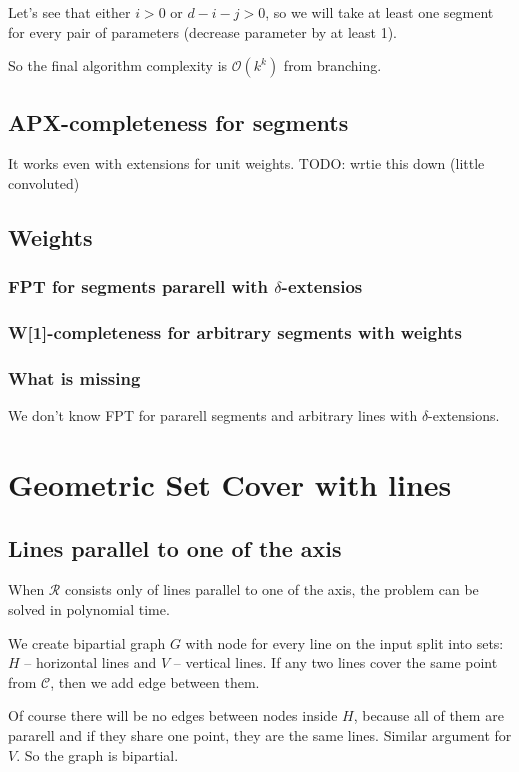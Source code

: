 \documentclass[en]{pracamgr}
\begin{document}
Let's see that either $i > 0$ or $d - i - j > 0$, so we will take
at least one segment for every pair of parameters
(decrease parameter by at least 1).

So the final algorithm complexity is $\mathcal{O}(k^k)$ from
branching.

\section{APX-completeness for segments}
It works even with extensions for unit weights.
TODO: wrtie this down (little convoluted)

\section{Weights}
\subsection{FPT for segments pararell with $\delta$-extensios}
\subsection{W[1]-completeness for arbitrary segments with weights}
\subsection{What is missing}
We don't know FPT for pararell segments
and arbitrary lines with $\delta$-extensions.

\chapter{Geometric Set Cover with lines}
\section{Lines parallel to one of the axis}
When $\mathcal{R}$ consists only of lines parallel to
one of the axis, the problem can be solved in
polynomial time.

We create bipartial graph $G$ with node for every line on the input
split into sets: $H$ -- horizontal lines and $V$ -- vertical lines.
If any two lines cover the same point from $\mathcal{C}$, then
we add edge between them.

Of course there will be no edges between nodes inside $H$,
because all of them are pararell and if they share 
one point, they are the same lines. Similar argument for $V$.
So the graph is bipartial.
\end{document}
